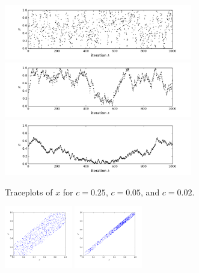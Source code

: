 \documentclass[12pt]{article}
\begin{document}
\begin{figure}
    \centering
    \begin{subfigure}[t]{1\textwidth}
        \centering
            \includegraphics[trim=0 0.4cm 0 0, clip, width=0.9\textwidth]{code/box-x_trace-c=0.25.png}
            \includegraphics[trim=0 0.4cm 0 0, clip, width=0.9\textwidth]{code/box-x_trace-c=0.05.png}
            \includegraphics[trim=0 0.4cm 0 0, clip, width=0.9\textwidth]{code/box-x_trace-c=0.02.png}
        \caption{Traceplots of $x$ for $c = 0.25$, $c = 0.05$, and $c = 0.02$.}
    \end{subfigure}
    \begin{subfigure}[t]{1\textwidth}
        \centering
            \includegraphics[trim=0.8cm 0.4cm 0.8cm 0, clip, width=0.325\textwidth]{code/box-scatter-c=0.25.png}
            \includegraphics[trim=0.8cm 0.4cm 0.8cm 0, clip, width=0.325\textwidth]{code/box-scatter-c=0.05.png}

\end{subfigure}
\end{figure}
\end{document}
